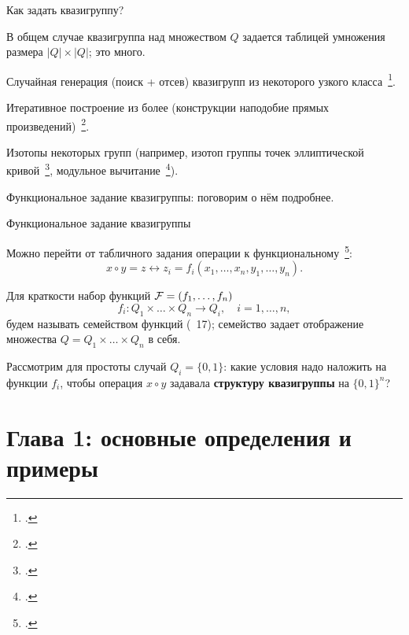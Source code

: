 \begin{frame}{Как задать квазигруппу?}
    \begin{coloritemize}
        \item В общем случае квазигруппа над множеством $Q$ задается таблицей умножения размера $\lvert Q \rvert \times \lvert Q \rvert$; это много.
        \pause 
        \item Случайная генерация (поиск + отсев) квазигрупп из некоторого узкого класса~\footcite{gligoroski2008public, chen2010multivariate}.
        \pause 
        \item Итеративное построение из более  (конструкции наподобие прямых произведений)~\footcite{gribovphd, EdonRprime}.
        \pause 
        \item Изотопы некоторых  групп (например, изотоп группы точек эллиптической кривой~\footcite{DH16}, модульное вычитание~\footcite{snavsel2009hash}).
        \pause 
        \item Функциональное задание квазигруппы: поговорим о нём подробнее.
    \end{coloritemize}
\end{frame}


\begin{frame}{Функциональное задание квазигруппы}
    \begin{coloritemize}
        \item Можно перейти от табличного задания операции к функциональному~\footcite{nosov08}: 
        \[
            x \circ y = z \leftrightarrow z_i = f_i(x_1, \ldots, x_n, y_1, \ldots, y_n). 
        \]
        \pause 
        \item Для краткости набор функций $\mathcal{F} = (f_1, \ldots, f_n)$
        \[
            f_i \colon Q_1 \times \ldots \times Q_n \to Q_i, \quad i = 1, \ldots, n,
        \]
        будем называть семейством функций (~17); семейство задает отображение множества $Q = Q_1 \times \ldots \times Q_n$ в себя.
        \pause
        \item Рассмотрим для простоты случай $Q_i = \{0, 1\}$: какие условия надо наложить на функции $f_i$, чтобы операция $x \circ y$ задавала \textbf{структуру квазигруппы} на $\{0, 1\}^n$?
    \end{coloritemize}
\end{frame}


\section{Глава 1: основные определения и примеры}



